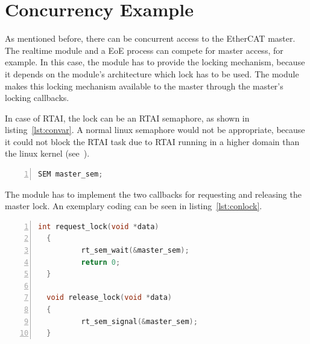 \documentclass[a4paper,12pt,BCOR6mm,bibtotoc,idxtotoc]{scrbook}
\begin{document}

\section{Concurrency Example}
\label{sec:concurrency}

As mentioned before, there can be concurrent access to the EtherCAT
master. The realtime module and a EoE process can compete
for master access, for example. In this case, the module has to
provide the locking mechanism, because it depends on the module's
architecture which lock has to be used. The module makes this locking
mechanism available to the master through the master's locking
callbacks.

In case of RTAI, the lock can be an RTAI semaphore, as shown in
listing~\ref{lst:convar}. A normal linux semaphore would not be
appropriate, because it could not block the RTAI task due to RTAI
running in a higher domain than the linux kernel (see~\cite{rtai}).

\begin{lstlisting}[language=C,numbers=left,caption={RTAI semaphore for
    concurrent access},label={lst:convar}]
  SEM master_sem;
\end{lstlisting}

The module has to implement the two callbacks for requesting and
releasing the master lock. An exemplary coding can be seen in
listing~\ref{lst:conlock}.

\begin{lstlisting}[language=C,numbers=left,caption={RTAI locking
    callbacks for concurrent access},label={lst:conlock}]
  int request_lock(void *data)
  {
          rt_sem_wait(&master_sem);
          return 0;
  }

  void release_lock(void *data)
  {
          rt_sem_signal(&master_sem);
  }
\end{lstlisting}
\end{document}
